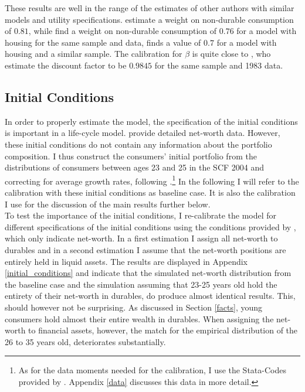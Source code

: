 \documentclass[a4paper,12pt,legno]{article}
\begin{document}
These results are well in the range of the estimates of other authors with similar models and utility specifications. \cite{FV&K2011} estimate a weight on non-durable consumption of $0.81$, while \cite{hintermaier2016} find a weight on non-durable consumption of $0.76$ for a model with housing for the same sample and data, \cite{gruber2003precautionary} finds a value of $0.7$ for a model with housing and a similar sample.
The calibration for $\beta$ is quite close to \cite{hintermaier2011}, who estimate the discount factor to be $0.9845$ for the same sample and 1983 data. 

\subsection{Initial Conditions}
In order to properly estimate the model, the specification of the initial conditions is important in a life-cycle model. \cite{hintermaier2011} provide detailed net-worth data. However, these initial conditions do not contain any information about the portfolio composition. I thus construct the consumers' initial portfolio from the distributions of consumers between ages 23 and 25 in the SCF 2004 and correcting for average growth rates, following \cite{hintermaier2011}.\footnote{As for the data moments needed for the calibration, I use the Stata-Codes provided by \cite{hintermaier2016}. Appendix \ref{data} discusses this data in more detail.} In the following I will refer to the calibration with these initial conditions as baseline case. It is also the calibration I use for the discussion of the main results further below.\\
To test the importance of the initial conditions, I re-calibrate the model for different specifications of the initial conditions using the conditions provided by \cite{hintermaier2011}, which only indicate net-worth. In a first estimation I assign all net-worth to durables and in a second estimation I assume that the net-worth positions are entirely held in liquid assets. The results are displayed in Appendix \ref{initial_conditions} and indicate that the simulated net-worth distribution from the baseline case and the simulation assuming that 23-25 years old hold the entirety of their net-worth in durables, do produce almost identical results. This, should however not be surprising. As discussed in Section \ref{facts}, young consumers hold almost their entire wealth in durables. When assigning the net-worth to financial assets, however, the match for the empirical distribution of the 26 to 35 years old, deteriorates substantially.    
\end{document}
